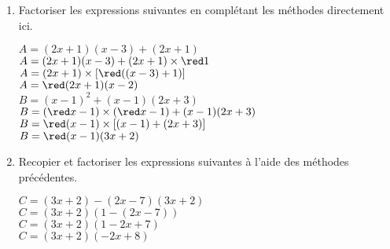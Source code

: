 \begin{corrige}
    \begin{enumerate}
        \item Factoriser les expressions suivantes en complétant les méthodes directement ici.\\
        \begin{itemize}
            \def\item{}
            \begin{spacing}{1.2}
                \item $A=(2x+1)(x-3)+(2x+1)$\\
                $A=(2x+1)(x-3)+(2x+1)\times {\red 1}$\\
                $A=(2x+1)\times \left[{\red ((x-3)+1)}\right]$\\
                $A={\red (2x+1)(x-2)}$\\
                \item $B=(x-1)^2+(x-1)(2x+3)$\\
                $B=({\red x-1})\times ({\red x-1})+(x-1)(2x+3)$\\
                $B={\red (x-1)\times\left[(x-1)+(2x+3)\right]}$\\
                $B={\red (x-1)(3x+2)}$\\
            \end{spacing}
        \end{itemize}
        \item Recopier et factoriser les expressions suivantes à l'aide des méthodes précédentes.\\
        \begin{itemize}
            \def\item{}
            \begin{spacing}{1.2}
                \item $C=(3x+2)-(2x-7)(3x+2)$\\
                {\red $C=(3x+2)(1-(2x-7))$\\$C=(3x+2)(1-2x+7)$\\$C=(3x+2)(-2x+8)$\\}
            \end{spacing}
        \end{itemize}      
    \end{enumerate}
    \Coupe
    \begin{enumerate}
        \setcounter{enumi}{1}          
        \begin{itemize}

\end{itemize}
\end{enumerate}
\end{corrige}
